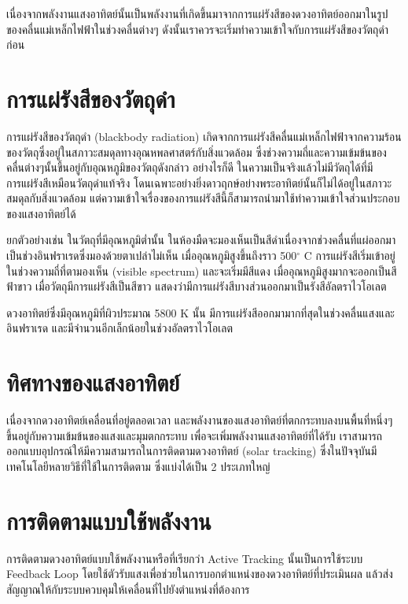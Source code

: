 \documentclass[a4paper,nobib,openany,10pt]{tufte-book}
\begin{document}
เนื่องจากพลังงานแสงอาทิตย์นั้นเป็นพลังงานที่เกิดขึ้นมาจากการแผ่รังสีของดวงอาทิตย์ออกมาในรูปของคลื่นแม่เหล็กไฟฟ้าในช่วงคลื่นต่างๆ
ดังนั้นเราควรจะเริ่มทำความเข้าใจกับการแผ่รังสีของวัตถุดำก่อน

\section{การแผ่รังสีของวัตถุดำ}
\label{sec:org189f56f}

การแผ่รังสีของวัตถุดำ (blackbody radiation) เกิดจากการแผ่รังสีคลื่นแม่เหล็กไฟฟ้าจากความร้อนของวัตถุซึ่งอยู่ในสภาวะสมดุลทางอุณหพลศาสตร์กับสิ่งแวดล้อม
ซึ่งช่วงความถี่และความเข้มข้นของคลื่นต่างๆนั้นขึ้นอยู่กับอุณหภูมิของวัตถุดังกล่าว
อย่างไรก็ดี
ในความเป็นจริงแล้วไม่มีวัตถุได้ที่มีการแผ่รังสีเหมือนวัตถุดำแท้จริง
โดนเฉพาะอย่างยิ่งดาวฤกษ์อย่างพระอาทิตย์นั้นก็ไม่ได้อยู่ในสภาวะสมดุลกับสิ่งแวดล้อม
แต่ความเข้าใจเรื่องของการแผ่รังสีนี้ก็สามารถนำมาใช้ทำความเข้าใจส่วนประกอบของแสงอาทิตย์ได้

ยกตัวอย่างเช่น ในวัตถุที่มีอุณหภูมิต่ำนั้น
ในห้องมืดจะมองเห็นเป็นสีดำเนื่องจากช่วงคลื่นที่แผ่ออกมาเป็นช่วงอินฟราเรดซึ่งมองด้วยตาเปล่าไม่เห็น
เมื่ออุณหภูมิสูงขึ้นถึงราว 500\(^{\circ}\) C
การแผ่รังสีเริ่มเข้าอยู่ในช่วงความถี่ที่ตามองเห็น (visible spectrum)
และจะเริ่มมีสีแดง เมื่ออุณหภูมิสูงมากจะออกเป็นสีฟ้าขาว
เมื่อวัตถุมีการแผ่รังสีเป็นสีขาว
แสดงว่ามีการแผ่รังสีบางส่วนออกมาเป็นรังสีอัลตราไวโอเลต

ดวงอาทิตย์ซึ่งมีอุณหภูมิที่ผิวประมาณ 5800 K นั้น
มีการแผ่รังสีออกมามากที่สุดในช่วงคลื่นแสงและอินฟราเรด
และมีจำนวนอีกเล็กน้อยในช่วงอัลตราไวโอเลต

\section{ทิศทางของแสงอาทิตย์}
\label{sec:orga061cda}
เนื่องจากดวงอาทิตย์เคลื่อนที่อยู่ตลอดเวลา
และพลังงานของแสงอาทิตย์ที่ตกกระทบลงบนพื้นที่หนึ่งๆขึ้นอยู่กับความเข้มข้นของแสงและมุมตกกระทบ
เพื่อจะเพิ่มพลังงานแสงอาทิตย์ที่ได้รับ
เราสามารถออกแบบอุปกรณ์ให้มีความสามารถในการติดตามดวงอาทิตย์ (solar
tracking) ซึ่งในปัจจุบันมีเทคโนโลยีหลายวิธีที่ใช้ในการติดตาม
ซึ่งแบ่งได้เป็น 2 ประเภทใหญ่

\section{การติดตามแบบใช้พลังงาน}
\label{sec:org2fe72d1}
การติดตามดวงอาทิตย์แบบใช้พลังงานหรือที่เรียกว่า Active Tracking
นั้นเป็นการใช้ระบบ Feedback Loop
โดยใช้ตัวรับแสงเพื่อช่วยในการบอกตำแหน่งของดวงอาทิตย์ที่ประเมินผล
แล้วส่งสัญญาณให้กับระบบควบคุมให้เคลื่อนที่ไปยังตำแหน่งที่ต้องการ
\end{document}
